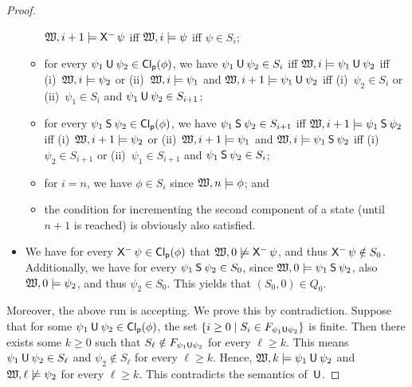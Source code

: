 \begin{proof}
\begin{itemize}
\begin{itemize}
                    $\Wmf,i+1\models\Previous\psi$ iff $\mathfrak{W},i\models\psi$ iff
                    $\psi\in S_i$;
                \item for every $\psi_1\mathbin{\mathsf{U}}\psi_2\in\operatorname{\mathsf{Cl_p}}(\phi)$, we have
                    $\psi_1\mathbin{\mathsf{U}}\psi_2\in S_i$ iff
                    $\mathfrak{W},i\models\psi_1\mathbin{\mathsf{U}}\psi_2$ iff
                    (i)~$\mathfrak{W},i\models\psi_2$ or (ii)~$\mathfrak{W},i\models\psi_1$ and
                    $\mathfrak{W},i+1\models\psi_1\mathbin{\mathsf{U}}\psi_2$ iff (i)~$\psi_2\in S_i$
                    or (ii)~$\psi_1\in S_i$ and $\psi_1\mathbin{\mathsf{U}}\psi_2\in S_{i+1}$;
                \item for every $\psi_1\mathbin{\mathsf{S}}\psi_2\in\operatorname{\mathsf{Cl_p}}(\phi)$, we have
                    $\psi_1\mathbin{\mathsf{S}}\psi_2\in S_{i+1}$ iff
                    $\mathfrak{W},i+1\models\psi_1\mathbin{\mathsf{S}}\psi_2$ iff
                    (i)~$\mathfrak{W},i+1\models\psi_2$ or (ii)~$\mathfrak{W},i+1\models\psi_1$
                    and $\mathfrak{W},i\models\psi_1\mathbin{\mathsf{S}}\psi_2$ iff
                    (i)~$\psi_2\in S_{i+1}$ or (ii)~$\psi_1\in S_{i+1}$ and
                    $\psi_1\mathbin{\mathsf{S}}\psi_2\in S_i$;
                \item for $i=n$, we have $\phi\in S_i$ since
                    $\mathfrak{W},n\models\phi$; and
                \item the condition for incrementing the second component of a
                    state (until $n+1$ is reached) is obviously also satisfied.
            \end{itemize}
        \item We have for every $\Previous\psi\in\PCl(\phi)$ that
            $\Wmf,0\not\models\Previous\psi$, and thus $\Previous\psi\notin S_0$.
            Additionally, we have for every $\psi_1\mathbin{\mathsf{S}}\psi_2\in S_0$, since
            $\mathfrak{W},0\models\psi_1\mathbin{\mathsf{S}}\psi_2$, also $\mathfrak{W},0\models\psi_2$, and
            thus $\psi_2\in S_0$.  This yields that $(S_0,0)\in Q_0$.
    \end{itemize}
    Moreover, the above run is accepting.  We prove this by contradiction.
    Suppose that for some $\psi_1\mathbin{\mathsf{U}}\psi_2\in\operatorname{\mathsf{Cl_p}}(\phi)$, the set
    $\{i\ge 0\mid S_i\in F_{\psi_1\mathbin{\mathsf{U}}\psi_2}\}$ is finite.  Then there exists
    some $k\ge 0$ such that $S_\ell\notin F_{\psi_1\mathbin{\mathsf{U}}\psi_2}$ for every
    $\ell\geq k$.  This means $\psi_1\mathbin{\mathsf{U}}\psi_2\in S_\ell$ and
    $\psi_2\notin S_\ell$ for every $\ell\ge k$.  Hence,
    $\mathfrak{W},k\models\psi_1\mathbin{\mathsf{U}}\psi_2$ and $\mathfrak{W},\ell\not\models\psi_2$ for every
    $\ell\ge k$.  This contradicts the semantics of~$\mathbin{\mathsf{U}}$.


\end{proof}
